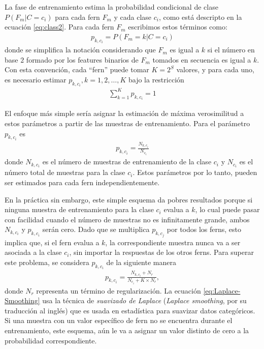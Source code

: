 		La fase de entrenamiento estima la probabilidad condicional de clase $P(F_m|C=c_i)$ para cada fern $F_m$	 y cada clase $c_i$, como está descripto en la ecuación \ref{eq:class2}. Para cada fern $F_m$ escribimos estos términos como:
		\begin{align}
			p_{k,c_i} = P(F_m = k | C = c_i)
		\end{align}
		donde se simplifica la notación considerando que $F_m$ es igual a $k$ si el número en base $2$ formado por los features binarios de $F_m$ tomados en secuencia es igual a $k$. Con esta convención, cada ``fern'' puede tomar $K=2^S$ valores, y para cada uno, es necesario estimar $p_{k,c_i}, k=1,2,\dots,K$ bajo la restricción
		\begin{align*}
			\sum_{k=1}^Kp_{k,c_i} = 1
		\end{align*}		
		
		El enfoque más simple sería asignar la estimación de máxima verosimilitud a estos parámetros a partir de las muestras de entrenamiento. Para el parámetro $p_{k,c_i}$ es
		\begin{align*}
			p_{k,c_i} = \frac{N_{k,c_i}}{N_{c_i}}
		\end{align*}
		donde $N_{k,c_i}$ es el número de muestras de entrenamiento de la clase $c_i$ y $N_{c_i}$ es el número total de muestras para la clase $c_i$. Estos parámetros por lo tanto, pueden ser estimados para cada fern independientemente.
		
		En la práctica sin embargo, este simple esquema da pobres resultados porque si ninguna muestra de entrenamiento para la clase $c_i$ evalua a $k$, lo cual puede pasar con facilidad cuando el número de muestras no es infinitamente grande, ambos $N_{k,c_i}$ y $p_{k,c_i}$ serán cero. Dado que se multiplica $p_{k,c_j}$ por todos los ferns, esto implica que, si el fern evalua a $k$, la correspondiente muestra nunca va a ser asociada a la clase $c_i$, sin importar la respuestas de los otros ferns. Para superar este problema, se considera $p_{k,c_i}$ de la siguiente manera
		\begin{align}
			\label{eq:Laplace-Smoothing}
			p_{k,c_i} = \frac{N_{k,c_i} + N_r}{N_{c_i} + K \times N_r},
		\end{align}
		donde $N_r$ representa un término de regularización. La ecuación \ref{eq:Laplace-Smoothing} usa la técnica de \textit{suavizado de Laplace} (\textit{Laplace smoothing}, por su traducción al inglés) que es usada en estadística para suavizar datos categóricos. Si una muestra con un valor específico de fern no se encuentra durante el entrenamiento, este esquema, aún le va a asignar un valor distinto de cero a la probabilidad correspondiente.